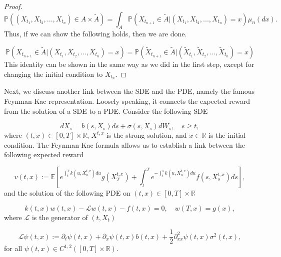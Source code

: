 \documentclass{article}
\begin{document}
\begin{proof}
\begin{equation*}
\mathbb{P}((X_{t_1},X_{t_2},...,X_{t_n})\in A\times\tilde{A})=\int_A\mathbb{P}(X_{t_{n+1}}\in\tilde{A}|(X_{t_1},X_{t_2},...,X_{t_n})=x)\mu_n(dx).
\end{equation*}
Thus, if we can show the following holds, then we are done.

\begin{equation*}
\mathbb{P}(X_{t_{n+1}}\in\tilde{A}|(X_{t_1},X_{t_2},...,X_{t_n})=x)=\mathbb{P}(\tilde{X}_{t_{n+1}}\in\tilde{A}|(\tilde{X}_{t_1},\tilde{X}_{t_2},...,\tilde{X}_{t_n})=x)
\end{equation*}
This identity can be shown in the same way as we did in the first step, except for changing the initial condition to $X_{t_n}$. 

\end{proof}

Next, we discuss another link between the SDE and the PDE, namely the famous Feynman-Kac representation. Loosely speaking, it connects the expected reward from the solution of a SDE to a PDE. Consider the following SDE

\begin{equation} \label{feynman_kac_sde}
dX_s = b(s,X_s)ds + \sigma(s,X_s)dW_s, \quad s\geq t,
\end{equation}
where $(t,x)\in[0,T]\times\mathbb{R}$, $X^{t,x}$ is the strong solution, and $x\in\mathbb{R}$ is the initial condition. The Feynman-Kac formula allows us to establish a link between the following expected reward

\begin{equation} \label{feynman_kac_reward}
v(t,x):=\mathbb{E}\left[e^{\int_t^Tk(u,X_u^{t,x})du}g(X_T^{t,x})+\int^T_te^{-\int^s_tk(u,X_u^{t,x})du}f(s,X_s^{t,x})ds\right],
\end{equation}
and the solution of the following PDE on $(t,x)\in[0,T]\times\mathbb{R}$

\begin{equation} \label{feynman_kac_pde}
k(t,x)w(t,x)-\mathcal{L}w(t,x)-f(t,x)=0, \quad w(T,x)=g(x),
\end{equation}
where $\mathcal{L}$ is the generator of $(t,X_t)$

\begin{equation} \label{feynman_kac_generator}
\mathcal{L}\psi(t,x):=\partial_t\psi(t,x)+\partial_x\psi(t,x)b(t,x)+\frac{1}{2}\partial^2_{xx}\psi(t,x)\sigma^2(t,x),
\end{equation}
for all $\psi(t,x)\in C^{1,2}([0,T]\times\mathbb{R})$.
\end{document}
